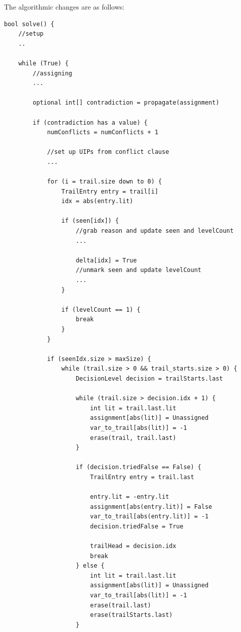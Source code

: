 \documentclass[../main.tex]{subfiles}
\begin{document}
The algorithmic changes are as follows:
\begin{lstlisting}
bool solve() {
    //setup
    ..

    while (True) {
        //assigning
        ...

        optional int[] contradiction = propagate(assignment)

        if (contradiction has a value) {
            numConflicts = numConflicts + 1

            //set up UIPs from conflict clause
            ...

            for (i = trail.size down to 0) {
                TrailEntry entry = trail[i]
                idx = abs(entry.lit)

                if (seen[idx]) {
                    //grab reason and update seen and levelCount
                    ...

                    delta[idx] = True
                    //unmark seen and update levelCount
                    ...
                }

                if (levelCount == 1) {
                    break
                }
            }

            if (seenIdx.size > maxSize) {
                while (trail.size > 0 && trail_starts.size > 0) {
                    DecisionLevel decision = trailStarts.last

                    while (trail.size > decision.idx + 1) {
                        int lit = trail.last.lit
                        assignment[abs(lit)] = Unassigned
                        var_to_trail[abs(lit)] = -1
                        erase(trail, trail.last)
                    }

                    if (decision.triedFalse == False) {
                        TrailEntry entry = trail.last

                        entry.lit = -entry.lit
                        assignment[abs(entry.lit)] = False
                        var_to_trail[abs(entry.lit)] = -1
                        decision.triedFalse = True

                        trailHead = decision.idx
                        break
                    } else {
                        int lit = trail.last.lit
                        assignment[abs(lit)] = Unassigned
                        var_to_trail[abs(lit)] = -1
                        erase(trail.last)
                        erase(trailStarts.last)
                    }
                    

\end{lstlisting}
\end{document}
